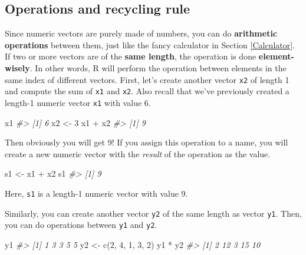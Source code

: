 \documentclass[
]{book}
\newenvironment{Shaded}{\begin{snugshade}}{\end{snugshade}}
\newcommand{\CommentTok}[1]{\textcolor[rgb]{0.56,0.35,0.01}{\textit{#1}}}
\newcommand{\DecValTok}[1]{\textcolor[rgb]{0.00,0.00,0.81}{#1}}
\newcommand{\FunctionTok}[1]{\textcolor[rgb]{0.00,0.00,0.00}{#1}}
\newcommand{\NormalTok}[1]{#1}
\newcommand{\OtherTok}[1]{\textcolor[rgb]{0.56,0.35,0.01}{#1}}
\newcommand{\SpecialCharTok}[1]{\textcolor[rgb]{0.00,0.00,0.00}{#1}}
\begin{document}
\hypertarget{operation-recycling}{%
\subsection{Operations and recycling rule}\label{operation-recycling}}

Since numeric vectors are purely made of numbers, you can do \textbf{arithmetic operations} between them, just like the fancy calculator in Section \ref{Calculator}. If two or more vectors are of the \textbf{same length}, the operation is done \textbf{element-wisely}. In other words, R will perform the operation between elements in the same index of different vectors. First, let's create another vector \texttt{x2} of length 1 and compute the sum of \texttt{x1} and \texttt{x2}. Also recall that we've previously created a length-1 numeric vector \texttt{x1} with value 6.

\begin{Shaded}
\begin{Highlighting}[]
\NormalTok{x1}
\CommentTok{\#\textgreater{} [1] 6}
\NormalTok{x2 }\OtherTok{\textless{}{-}} \DecValTok{3}
\NormalTok{x1 }\SpecialCharTok{+}\NormalTok{ x2}
\CommentTok{\#\textgreater{} [1] 9}
\end{Highlighting}
\end{Shaded}

Then obviously you will get 9! If you assign this operation to a name, you will create a new numeric vector with the \emph{result} of the operation as the value.

\begin{Shaded}
\begin{Highlighting}[]
\NormalTok{s1 }\OtherTok{\textless{}{-}}\NormalTok{ x1 }\SpecialCharTok{+}\NormalTok{ x2}
\NormalTok{s1 }
\CommentTok{\#\textgreater{} [1] 9}
\end{Highlighting}
\end{Shaded}

Here, \texttt{s1} is a length-1 numeric vector with value 9.

Similarly, you can create another vector \texttt{y2} of the same length as vector \texttt{y1}. Then, you can do operations between \texttt{y1} and \texttt{y2}.

\begin{Shaded}
\begin{Highlighting}[]
\NormalTok{y1}
\CommentTok{\#\textgreater{} [1] 1 3 3 5 5}
\NormalTok{y2 }\OtherTok{\textless{}{-}} \FunctionTok{c}\NormalTok{(}\DecValTok{2}\NormalTok{, }\DecValTok{4}\NormalTok{, }\DecValTok{1}\NormalTok{, }\DecValTok{3}\NormalTok{, }\DecValTok{2}\NormalTok{)}
\NormalTok{y1 }\SpecialCharTok{*}\NormalTok{ y2}
\CommentTok{\#\textgreater{} [1]  2 12  3 15 10}
\end{Highlighting}
\end{Shaded}
\end{document}
